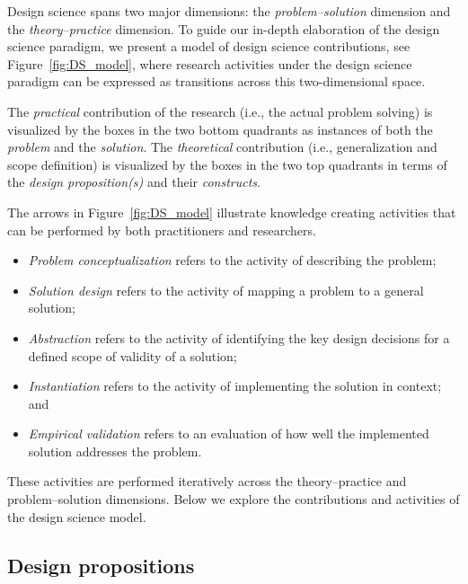 \documentclass[graybox]{svmult}
\newcommand{\peggy}[1]{\textcolor{blue}{{\it [Peggy says: #1]}}}
\newcommand{\per}[1]{\textcolor{cyan}{{\it [Per says: #1]}}}
\newcommand{\peggy}[1]{}
\newcommand{\per}[1]{}
\begin{document}
Design science spans two major dimensions: the \emph{problem--solution} dimension and the \emph{theory--practice} dimension. To guide our in-depth elaboration of the design science paradigm, we present a model of design science contributions, see Figure~\ref{fig:DS_model}, where research activities under the design science paradigm can be expressed as transitions across this two-dimensional space.

The \emph{practical} contribution of the research (i.e., the actual problem solving) is visualized by the boxes in the two bottom quadrants as instances of both the \emph{problem} and the \emph{solution}. The \emph{theoretical} contribution (i.e., generalization and scope definition) is visualized by the boxes in the two top quadrants in terms of the \emph{design proposition(s)} and their \emph{constructs}. 

The arrows in Figure~\ref{fig:DS_model} illustrate knowledge creating activities that can be performed by both practitioners and researchers. 
\begin{itemize}
\item \emph{Problem conceptualization} refers to the activity of describing the problem; %
\item \emph{Solution design} refers to the activity of mapping a problem to a general solution; 
\item \emph{Abstraction} refers to the activity of identifying the key design decisions for a defined scope of validity of a solution; 
\item \emph{Instantiation} refers to the activity of implementing the solution in context; and 
\item \emph{Empirical validation} refers to an evaluation of how well the implemented solution addresses the problem.
\end{itemize}

These activities are performed iteratively across the theory--practice and problem--solution dimensions. Below we explore the contributions and activities of the design science model. 

\subsection{Design propositions}
\label{sec:technologicalrules}
\end{document}
